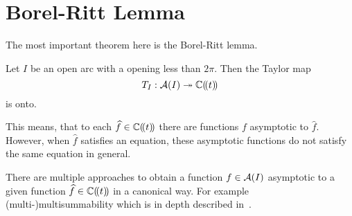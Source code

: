 \section{Borel-Ritt Lemma}
\begin{comment}
  \begin{itemize}
    \item \cite[Lem.II.2.2.5]{sabbah_cimpa90}: $T_I$
    \item \textbf{\cite[Th.7.3]{van2003galois}}: $T_I=T_{(a,b)}$
    \item \cite[Th.2.4.1]{Loday2014}: $T_{\mathfrak{s}}$
    \item \cite[4.4.Thm.16]{Balser2000Formal}
  \end{itemize}
\end{comment}
The most important theorem here is the Borel-Ritt lemma.
\begin{thm}
  \label{thm:borel-ritt}
  Let $I$ be an open arc with a opening less than $2\pi$. Then the Taylor map
  \[
    T_{I}:\mathcal{A}(I)\twoheadrightarrow\mathbb{C}(\!(t)\!)
  \]
  is onto.
  \begin{s-rem}
    This means, that to each $\widehat f\in\mathbb{C}(\!(t)\!)$ there are functions $f$
    asymptotic to $\hat f$.
    However, when $\hat f$ satisfies an equation, these asymptotic functions do
    not satisfy the same equation in general.
     
  \end{s-rem}
\end{thm}
There are multiple approaches to obtain a function $f\in\mathcal{A}(I)$ asymptotic to a
given function $\widehat f\in\mathbb{C}(\!(t)\!)$ in a canonical way. For example
(multi-)multisummability which is in depth described in~\cite{Loday2014}.
